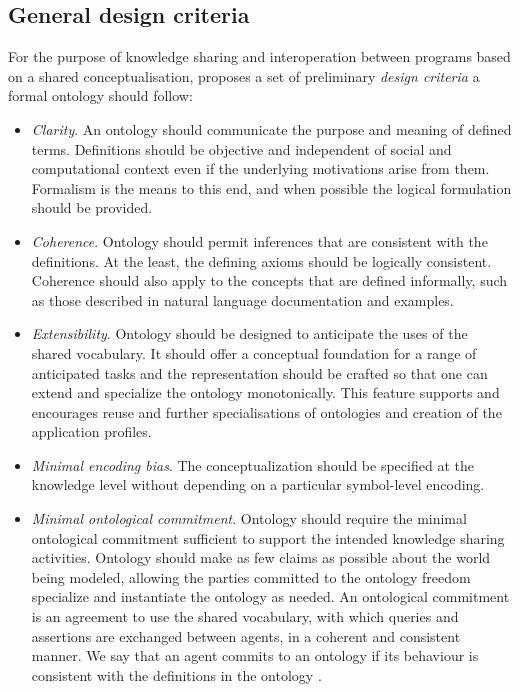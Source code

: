 	
	\subsection{General design criteria}
	\label{sec:design-criteria}
	
	For the purpose of knowledge sharing and interoperation between programs based on a shared conceptualisation, \citet{gruber1995} proposes a set of preliminary \textit{design criteria} a formal ontology should follow:
	
	\begin{itemize}
		\item \textit{Clarity}. An ontology should communicate the purpose and meaning of defined terms. Definitions should be objective and independent of social and computational context even if the underlying motivations arise from them. Formalism is the means to this end, and when possible the logical formulation should be provided. 
		\item \textit{Coherence}. Ontology should permit inferences that are consistent with the definitions. At the least, the defining axioms should be logically consistent. Coherence should also apply to the concepts that are defined informally, such as those described in natural language documentation and examples.
		\item \textit{Extensibility}. Ontology should be designed to anticipate the uses of the shared vocabulary. It should offer a conceptual foundation for a range of anticipated tasks and the representation should be crafted so that one can extend and specialize the ontology monotonically. This feature supports and encourages reuse and further specialisations of ontologies and creation of the application profiles. 
		\item \textit{Minimal encoding bias}. The conceptualization should be specified at the knowledge level without depending on a particular symbol-level encoding. 
		\item \textit{Minimal ontological commitment}. Ontology should require the minimal ontological commitment sufficient to support the intended knowledge sharing activities. Ontology should make as few claims as possible about the world being modeled, allowing the parties committed to the ontology freedom specialize and instantiate the ontology as needed. An ontological commitment is an agreement to use the shared vocabulary, with which queries and assertions are exchanged between agents, in a coherent and consistent manner. We say that an agent commits to an ontology if its behaviour is consistent with the definitions in the ontology \cite{gruber1995}.		
	\end{itemize}	